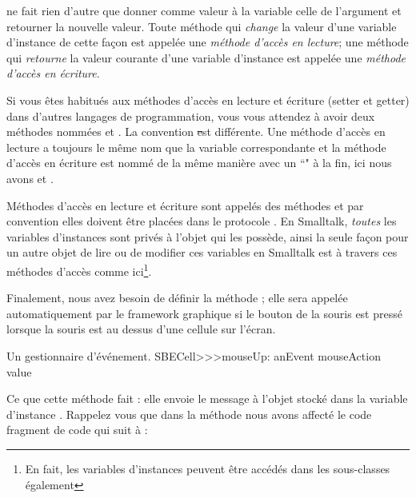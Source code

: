 \documentclass[a4paper,10pt,twoside]{book}
\begin{document}
 ne fait rien d'autre que donner comme valeur à la variable  celle de l'argument et retourner la nouvelle valeur. Toute méthode qui \emph{change} la valeur d'une variable d'instance de cette façon est appelée une \emph{méthode d'accès en lecture}; une méthode qui \emph{retourne} la valeur courante d'une variable d'instance est appelée une \emph{méthode d'accès en écriture}.

Si vous êtes habitués aux méthodes d'accès en lecture et écriture (setter et getter) dans d'autres langages de programmation, vous vous attendez à avoir deux méthodes nommées  et .
La convention \st est différente.
Une méthode d'accès en lecture a toujours le même nom que la variable correspondante et la méthode d'accès en écriture est nommé de la même manière avec un ``\ct{:}" à la fin, ici nous avons  et .

Méthodes d'accès en lecture et écriture sont appelés des méthodes  et par convention elles doivent être placées dans le protocole .
En Smalltalk, \emph{toutes} les variables d'instances sont privés à l'objet qui les possède, ainsi la seule façon pour un autre objet de lire ou de modifier ces variables en Smalltalk est à travers ces méthodes d'accès comme ici\footnote{En fait, les variables d'instances peuvent être accédés dans les sous-classes également}.


Finalement, nous avez besoin de définir la méthode ; elle sera appelée automatiquement par le framework graphique si le bouton de la souris est pressé lorsque la souris est au dessus d'une cellule sur l'écran.

\begin{method}[sbecellmouseup]{Un gestionnaire d'événement.}
SBECell>>>mouseUp: anEvent
   mouseAction value
\end{method}


Ce que cette méthode fait : elle envoie le message  à l'objet stocké dans la variable d'instance . 
Rappelez vous que dans la méthode  nous avons affecté le code fragment de code qui suit à :
\end{document}
